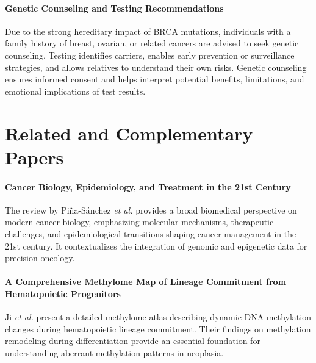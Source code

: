 \documentclass[10pt]{extarticle}
\begin{document}
\paragraph{Genetic Counseling and Testing Recommendations}
Due to the strong hereditary impact of BRCA mutations, individuals with a family history of breast, ovarian, or related cancers are advised to seek genetic counseling. Testing identifies carriers, enables early prevention or surveillance strategies, and allows relatives to understand their own risks. Genetic counseling ensures informed consent and helps interpret potential benefits, limitations, and emotional implications of test results.

\section{Related and Complementary Papers}

\paragraph{Cancer Biology, Epidemiology, and Treatment in the 21st Century}
The review by Piña-Sánchez \textit{et al.} \cite{pina2022cancer} provides a broad biomedical perspective on modern cancer biology, emphasizing molecular mechanisms, therapeutic challenges, and epidemiological transitions shaping cancer management in the 21st century. It contextualizes the integration of genomic and epigenetic data for precision oncology.

\paragraph{A Comprehensive Methylome Map of Lineage Commitment from Hematopoietic Progenitors}
Ji \textit{et al.} \cite{ji2010comprehensive} present a detailed methylome atlas describing dynamic DNA methylation changes during hematopoietic lineage commitment. Their findings on methylation remodeling during differentiation provide an essential foundation for understanding aberrant methylation patterns in neoplasia.






\printbibliography
\end{document}
